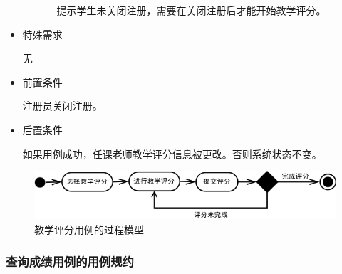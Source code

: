 \begin{itemize}
\begin{enumerate}
\begin{enumerate}[{2}.1]
      \CJKindent 提示学生未关闭注册，需要在关闭注册后才能开始教学评分。
    \end{enumerate}
  \end{enumerate}
  
  \item 特殊需求
  
  \CJKindent 无
  
  \item 前置条件
  
  \CJKindent 注册员关闭注册。
  
  \item 后置条件
  
  \CJKindent 如果用例成功，任课老师教学评分信息被更改。否则系统状态不变。
\end{itemize}

\begin{figure}[H]
  \centering
  \includegraphics[scale=0.7]{img/jwxt_accessment.png}
  \caption{教学评分用例的过程模型}
\end{figure}

\subsubsection{查询成绩用例的用例规约}

